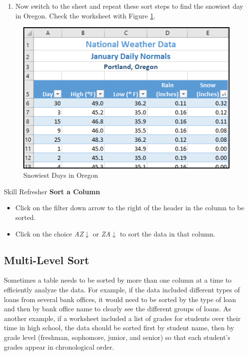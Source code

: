 \begin{enumerate}
	\item Now switch to the  sheet and repeat these sort steps to find the snowiest day in Oregon. Check the worksheet with Figure \ref{05:fig10}.
\end{enumerate}

\begin{figure}[H]
	\centering
	\includegraphics[width=\maxwidth{.95\linewidth}]{gfx/ch05_fig10}
	\caption{Snowiest Days in Oregon}
	\label{05:fig10}
\end{figure}

\begin{center}
	\begin{sklbox}{Skill Refresher}
		\textbf{Sort a Column}
		\\
		\begin{itemize}
			\setlength{\itemsep}{0pt}
			\setlength{\parskip}{0pt}
			\setlength{\parsep}{0pt}

			\item Click on the filter down arrow to the right of the header in the column to be sorted.
			\item Click on the choice \textit{AZ}$ \downarrow $ or \textit{ZA}$ \downarrow $ to sort the data in that column.
						
		\end{itemize}
	\end{sklbox}
\end{center}

\subsection{Multi-Level Sort}

Sometimes a table needs to be sorted by more than one column at a time to efficiently analyze the data. For example, if the data included different types of loans from several bank offices, it would need to be sorted by the type of loan and then by bank office name to clearly see the different groups of loans. As another example, if a worksheet included a list of grades for students over their time in high school, the data should be sorted first by student name, then by grade level (freshman, sophomore, junior, and senior) so that each student's grades appear in chronological order.

